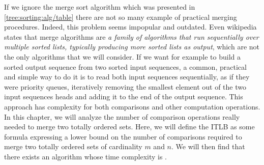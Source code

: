 \label{tree:merging:intro}

If we ignore the merge sort algorithm which was presented in
\ref{tree:sorting:alg/table} there are not so many example of practical merging
procedures. Indeed, this problem seems impopular and outdated. Even wikipedia
states that merge algorithms are \emph{a family of algorithms that run
sequentially over multiple sorted lists, typically producing more sorted lists
as output}, which are not the only algorithms that we will consider. If we want
for example to build a sorted output sequence from two sorted input sequences,
a common, practical and simple way to do it is to read both input sequences
sequentially, as if they were priority queues, iteratively removing the
smallest element out of the two input sequences heads and adding it to the end
of the output sequence. This approach has  complexity for both
comparisons and other computation operations. In this chapter, we will analyze
the number of comparison operations really needed to merge two totally ordered
sets. Here, we will define the ITLB as some formula expressing a lower bound on
the number of comparisons required to merge two totally ordered sets of
cardinality $m$ and $n$. We will then find that there exists an algorithm whose
time complexity is .

